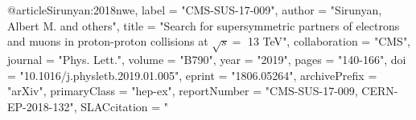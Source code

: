 @article{Sirunyan:2018nwe,
      label          = "CMS-SUS-17-009",
      author         = "Sirunyan, Albert M. and others",
      title          = "{Search for supersymmetric partners of electrons and
                        muons in proton-proton collisions at $\sqrt{s}=$ 13 TeV}",
      collaboration  = "CMS",
      journal        = "Phys. Lett.",
      volume         = "B790",
      year           = "2019",
      pages          = "140-166",
      doi            = "10.1016/j.physletb.2019.01.005",
      eprint         = "1806.05264",
      archivePrefix  = "arXiv",
      primaryClass   = "hep-ex",
      reportNumber   = "CMS-SUS-17-009, CERN-EP-2018-132",
      SLACcitation   = "%
}

